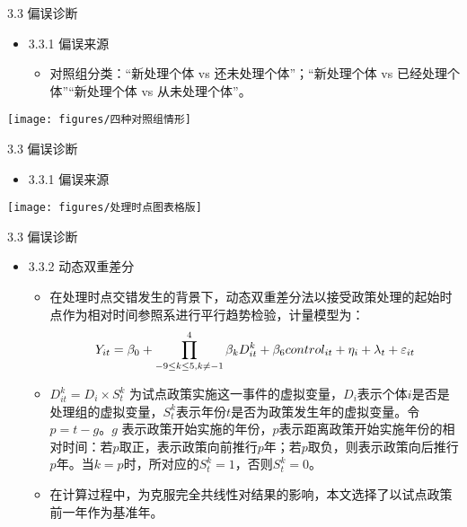 \documentclass{beamer}%
\begin{document}
\begin{frame}[t]{\large 3.3 偏误诊断}
\begin{itemize}
  \item 3.3.1 偏误来源
  \begin{itemize}
  \item 对照组分类：“新处理个体 vs 还未处理个体”；“新处理个体 vs 已经处理个体”“新处理个体 vs 从未处理个体”。
  \end{itemize}
\end{itemize}
\vspace{-0.2cm} %
\begin{center}
	\texttt{[image: figures/四种对照组情形]}
\end{center}
\end{frame}

\begin{frame}[t]{\large 3.3 偏误诊断}
\begin{itemize}
  \item 3.3.1 偏误来源
\end{itemize}
\begin{center}
	\texttt{[image: figures/处理时点图表格版]}
\end{center}
\end{frame}



\begin{frame}[t]{\large 3.3 偏误诊断}
\begin{itemize}
  \item 3.3.2 动态双重差分
  \begin{itemize}
  \item 在处理时点交错发生的背景下，动态双重差分法以接受政策处理的起始时点作为相对时间参照系进行平行趋势检验，计量模型为：
    \begin{equation}
    \setlength{\abovedisplayskip}{4pt}
    \setlength{\belowdisplayskip}{4pt}
     Y_{i t}=\beta_0+\prod_{-9 \leq k \leq 5, k \neq-1}^4 \beta_k D_{i t}^k+\beta_6 control_{i t}+\eta_i+\lambda_t+\varepsilon_{i t}
    \end{equation}
  \item $D_{i t}^k=D_i\times S_{t}^{k}$ 为试点政策实施这一事件的虚拟变量，$D_i$表示个体$i$是否是处理组的虚拟变量，$S_{t}^{k}$表示年份$t$是否为政策发生年的虚拟变量。令$p=t-g$。$g$ 表示政策开始实施的年份，$p$表示距离政策开始实施年份的相对时间：若$p$取正，表示政策向前推行$p$年；若$p$取负，则表示政策向后推行$p$年。当$k=p$时，所对应的$S_{t}^{k}=1$，否则$S_{t}^{k}=0$。
  \item 在计算过程中，为克服完全共线性对结果的影响，本文选择了以试点政策前一年作为基准年。
  \end{itemize}
\end{itemize}
\end{frame}
\end{document}
